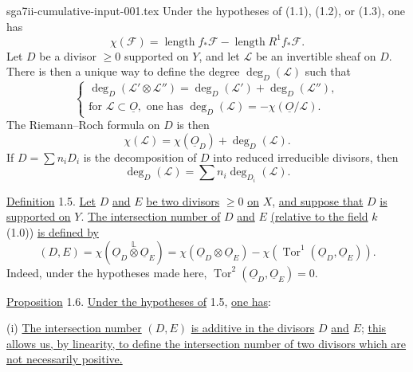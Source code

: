\begin{filecontents*}{sga7ii-cumulative-input-001.tex}
Under the hypotheses of (1.1), (1.2), or (1.3), one has
\begin{equation}\tag{1.4.4}
\chi(\mathcal F)=\operatorname{length}f_*\mathcal F-
\operatorname{length}R^1f_*\mathcal F.
\end{equation}
Let $D$ be a divisor $\geq0$ supported on $Y$, and let $\mathcal L$ be an invertible
sheaf on $D$.  There is then a unique way to define the degree
$\deg_D(\mathcal L)$ such that
\begin{equation}\tag{1.4.5}
\left\{
\begin{array}{l}
\deg_D(\mathcal L'\otimes\mathcal L'')=
\deg_D(\mathcal L')+\deg_D(\mathcal L''),\\[3ex]
\text{for }\mathcal L\subset\underline O,
\text{ one has }\deg_D(\mathcal L)=-\chi(\underline O/\mathcal L).
\end{array}
\right.
\end{equation}
The Riemann--Roch formula on $D$ is then
\begin{equation}\tag{1.4.6}
\chi(\mathcal L)=\chi(\underline{O}_D)+\deg_D(\mathcal L).
\end{equation}
If $D=\sum n_iD_i$ is the decomposition of $D$ into reduced irreducible divisors,
then
\begin{equation}\tag{1.4.7}
\deg_D(\mathcal L)=\sum n_i\deg_{D_i}(\mathcal L).
\end{equation}

\underline{Definition} 1.5. \underline{Let} $D$ \underline{and} $E$
\underline{be two divisors} $\geq0$ \underline{on} $X$, \underline{and suppose that}
$D$ \underline{is supported on} $Y$. \underline{The intersection number of} $D$
\underline{and} $E$ \underline{(relative to the field} $k$ (1.0)) \underline{is
defined by}
\begin{equation*}
(D,E)=\chi(\underline{O}_D\overset{\mathbb L}{\otimes}\underline{O}_E)
=\chi(\underline{O}_D\otimes\underline{O}_E)
-\chi(\operatorname{Tor}^1(\underline{O}_D,\underline{O}_E)).
\end{equation*}
Indeed, under the hypotheses made here,
$\operatorname{Tor}^2(\underline{O}_D,\underline{O}_E)=0$.

\underline{Proposition} 1.6. \underline{Under the hypotheses of} 1.5,
\underline{one has}:

(i) \quad \underline{The intersection number} $(D,E)$ \underline{is additive in the
divisors} $D$ \underline{and} $E$; \underline{this allows us, by linearity, to define
the intersection number of two divisors which are not necessarily positive.}


\end{filecontents*}
